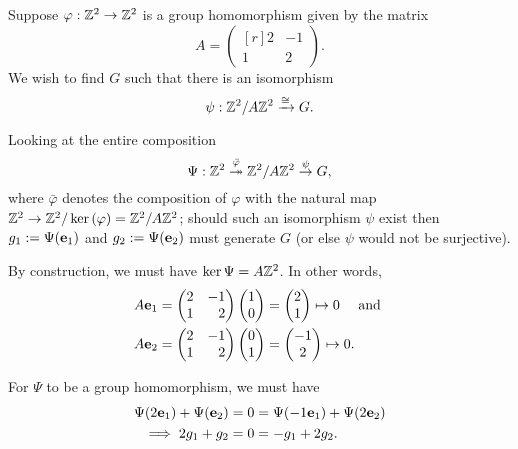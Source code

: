 \documentclass[../algebraNotesMSRI-UP2016.tex]{subfiles}
\begin{document}
\begin{frame}{}{}
\begin{ex}\label{ex:notObviousZmod5Z}
Suppose $\varphi:\mathbb Z^2\to \mathbb Z^2$ is a group homomorphism given by the matrix 
\[
A=\begin{pmatrix*}[r]
	2 & -1 \\
	1 & 2
	\end{pmatrix*}.
\]
We wish to find $G$ such that there is an isomorphism
\[
\psi:\mathbb Z^2/A\mathbb Z^2\xrightarrow{\cong} G.
\]
\end{ex}

\smallGap
Looking at the entire composition 
\begin{equation}\label{eq:compPresentation}
\Psi:\mathbb Z^2\overset{\bar{\varphi}}{\twoheadrightarrow} \mathbb Z^2/A\mathbb Z^2 \overset{\psi}{\to} G,
\end{equation}
where $\bar{\varphi}$ denotes the composition of $\varphi$ with the natural map $\mathbb Z^2\to\mathbb Z^2/\ker{(\varphi)}=\mathbb Z^2/A\mathbb Z^2$; should such an isomorphism $\psi$ exist then $g_1:=\Psi(\mathbf e_1)$ and $g_2:=\Psi(\mathbf e_2)$ must generate $G$ (or else $\psi$ would not be surjective).
\end{frame}

\begin{frame}[c]
By construction, we must have $\ker{\Psi}=A\mathbb Z^2$.  In other words,
\begin{align*}
A\vect e_1= 
	\begin{pmatrix*}[r]
	2 & -1 \\
	1 & 2 
	\end{pmatrix*}
	\begin{pmatrix}
	1 \\
	0 
	\end{pmatrix}	
	&= \begin{pmatrix}
		2 \\
		1
		\end{pmatrix}
	\mapsto 0 \quad\text{ and } \\
A\vect e_2= 
	\begin{pmatrix*}[r]
	2 & -1 \\
	1 & 2 
	\end{pmatrix*}
	\begin{pmatrix}
	0 \\
	1 
	\end{pmatrix}	
	&= \begin{pmatrix}
		-1 \\
		2
		\end{pmatrix}
	\mapsto 0.	
\end{align*}

\smallGap
For $\Psi$ to be a group homomorphism, we must have  
\begin{align*}
\Psi(2\mathbf e_1)+\Psi(\mathbf e_2) &= 0 = \Psi(-1\mathbf e_1)+\Psi(2\mathbf e_2) \\
\implies 2g_1+g_2 &= 0 = -g_1+2g_2.
\end{align*}
\end{frame}
\end{document}
